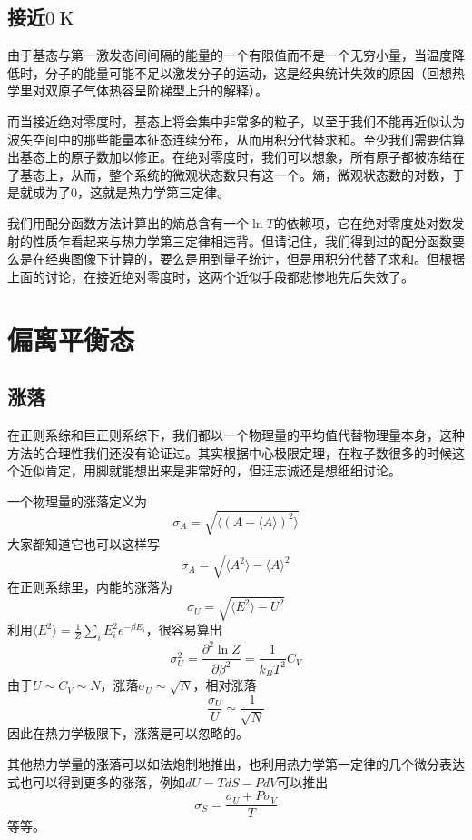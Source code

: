 \documentclass[a4paper,11pt]{ctexart}
\newcommand{\beq}{\begin{equation}}
\newcommand{\eeq}{\end{equation}}
\begin{document}
\subsection{接近$0\mathrm{\ K}$}
由于基态与第一激发态间间隔的能量的一个有限值而不是一个无穷小量，当温度降低时，分子的能量可能不足以激发分子的运动，这是经典统计失效的原因（回想热学里对双原子气体热容呈阶梯型上升的解释）。\par
而当接近绝对零度时，基态上将会集中非常多的粒子，以至于我们不能再近似认为波矢空间中的那些能量本征态连续分布，从而用积分代替求和。至少我们需要估算出基态上的原子数加以修正。在绝对零度时，我们可以想象，所有原子都被冻结在了基态上，从而，整个系统的微观状态数只有这一个。熵，微观状态数的对数，于是就成为了0，这就是热力学第三定律。\par
我们用配分函数方法计算出的熵总含有一个$\ln T$的依赖项，它在绝对零度处对数发射的性质乍看起来与热力学第三定律相违背。但请记住，我们得到过的配分函数要么是在经典图像下计算的，要么是用到量子统计，但是用积分代替了求和。但根据上面的讨论，在接近绝对零度时，这两个近似手段都悲惨地先后失效了。

\section{偏离平衡态}

\subsection{涨落}
在正则系综和巨正则系综下，我们都以一个物理量的平均值代替物理量本身，这种方法的合理性我们还没有论证过。其实根据中心极限定理，在粒子数很多的时候这个近似肯定，用脚就能想出来是非常好的，但汪志诚还是想细细讨论。\par
一个物理量的涨落定义为
\beq
\sigma_A = \sqrt{\langle (A - \langle A \rangle )^2 \rangle }
\eeq
大家都知道它也可以这样写
\beq
\sigma_A = \sqrt{\langle A^2 \rangle - \langle A \rangle^2 }
\eeq
在正则系综里，内能的涨落为
\beq
\sigma_U = \sqrt{\langle E^2 \rangle - U^2}
\eeq
利用$\langle E^2 \rangle = \frac{1}{Z} \sum_i E_i^2 e^{-\beta E_i}$，很容易算出
\beq
\sigma_U^2 = \frac{\partial^2 \ln Z}{\partial \beta^2} = \frac{1}{k_B T^2} C_V
\eeq
由于$U \sim C_V \sim N$，涨落$\sigma_U \sim \sqrt{N}$，相对涨落\beq 
\frac{\sigma_U}{U} \sim \frac{1}{\sqrt{N}} 
\eeq
因此在热力学极限下，涨落是可以忽略的。
\par
其他热力学量的涨落可以如法炮制地推出，也利用热力学第一定律的几个微分表达式也可以得到更多的涨落，例如$dU = TdS - PdV$可以推出
\beq
\sigma_S = \frac{\sigma_U + P \sigma_V}{T}
\eeq
等等。
\end{document}
